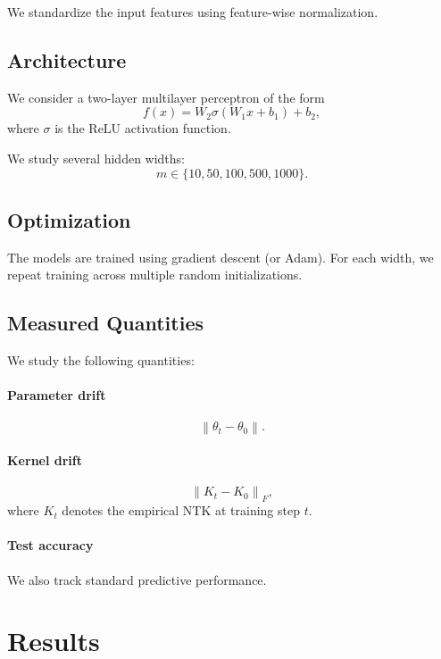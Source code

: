 \documentclass[11pt]{article}
\newcommand{\norm}[1]{\left\lVert #1 \right\rVert}
\begin{document}
We standardize the input features using feature-wise normalization.

\subsection{Architecture}

We consider a two-layer multilayer perceptron of the form
\[
f(x)
=
W_2 \sigma(W_1 x + b_1) + b_2,
\]
where $\sigma$ is the ReLU activation function.

We study several hidden widths:
\[
m \in \{10, 50, 100, 500, 1000\}.
\]

\subsection{Optimization}

The models are trained using gradient descent (or Adam).
For each width, we repeat training across multiple random initializations.

\subsection{Measured Quantities}

We study the following quantities:

\paragraph{Parameter drift}
\[
\norm{\theta_t - \theta_0}.
\]

\paragraph{Kernel drift}
\[
\norm{K_t - K_0}_F,
\]
where $K_t$ denotes the empirical NTK at training step $t$.

\paragraph{Test accuracy}

We also track standard predictive performance.

\section{Results}
\end{document}
